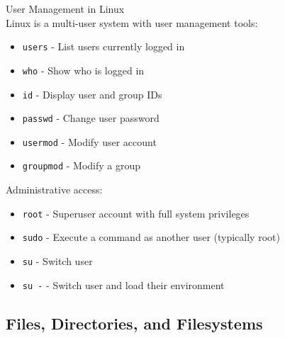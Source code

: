 \begin{definition}{User Management in Linux}\\
    Linux is a multi-user system with user management tools:
    \begin{itemize}
        \item \texttt{users} - List users currently logged in
        \item \texttt{who} - Show who is logged in
        \item \texttt{id} - Display user and group IDs
        \item \texttt{passwd} - Change user password
        \item \texttt{usermod} - Modify user account
        \item \texttt{groupmod} - Modify a group
    \end{itemize}
    
    Administrative access:
    \begin{itemize}
        \item \texttt{root} - Superuser account with full system privileges
        \item \texttt{sudo} - Execute a command as another user (typically root)
        \item \texttt{su} - Switch user
        \item \texttt{su -} - Switch user and load their environment
    \end{itemize}
\end{definition}

\subsection{Files, Directories, and Filesystems}

